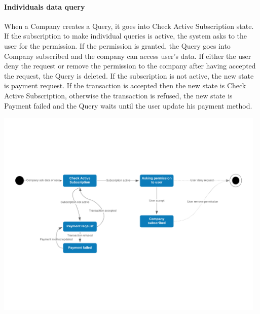 \paragraph{Individuals data query}
When a Company creates a Query, it goes into Check Active Subscription state. If the subscription to make individual queries is active, the system asks to the user for the permission. If the permission is granted, the Query goes into Company subscribed and the company can access user's data. If either the user deny the request or remove the permission to the company after having accepted the request, the Query is deleted.
If the subscription is not active, the new state is payment request. If the transaction is accepted then the new state is Check Active Subscription, otherwise the transaction is refused, the new state is Payment failed and the Query waits until the user update his payment method.
\begin{center}
    \includegraphics[width=13cm]{assets/IndividualRequest.pdf}
\end{center}